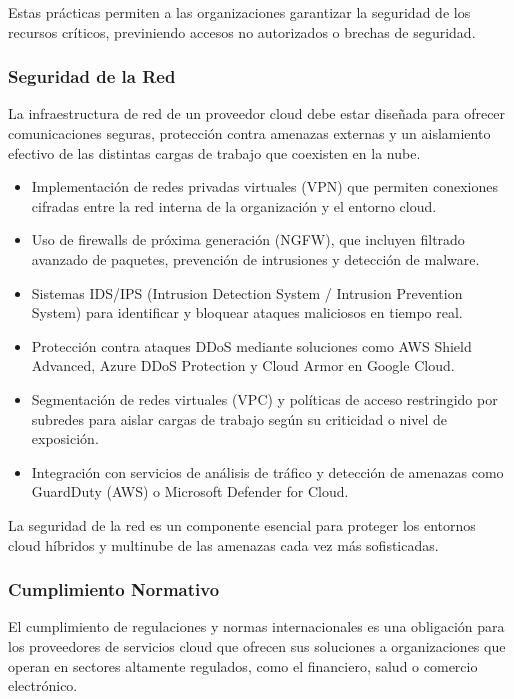 {                Estas prácticas permiten a las organizaciones garantizar la seguridad de los recursos críticos, previniendo accesos no autorizados o brechas de seguridad.
                
            \subsubsection{Seguridad de la Red}
                La infraestructura de red de un proveedor cloud debe estar diseñada para ofrecer comunicaciones seguras, protección contra amenazas externas y un aislamiento efectivo de las distintas cargas de trabajo que coexisten en la nube.
                
                \begin{itemize}
                    \item Implementación de redes privadas virtuales (VPN) que permiten conexiones cifradas entre la red interna de la organización y el entorno cloud.
                    \item Uso de firewalls de próxima generación (NGFW), que incluyen filtrado avanzado de paquetes, prevención de intrusiones y detección de malware.
                    \item Sistemas IDS/IPS (Intrusion Detection System / Intrusion Prevention System) para identificar y bloquear ataques maliciosos en tiempo real.
                    \item Protección contra ataques DDoS mediante soluciones como AWS Shield Advanced, Azure DDoS Protection y Cloud Armor en Google Cloud.
                    \item Segmentación de redes virtuales (VPC) y políticas de acceso restringido por subredes para aislar cargas de trabajo según su criticidad o nivel de exposición.
                    \item Integración con servicios de análisis de tráfico y detección de amenazas como GuardDuty (AWS) o Microsoft Defender for Cloud.
                \end{itemize}
                
                La seguridad de la red es un componente esencial para proteger los entornos cloud híbridos y multinube de las amenazas cada vez más sofisticadas.
                
            \subsubsection{Cumplimiento Normativo}
                El cumplimiento de regulaciones y normas internacionales es una obligación para los proveedores de servicios cloud que ofrecen sus soluciones a organizaciones que operan en sectores altamente regulados, como el financiero, salud o comercio electrónico.
                
}
